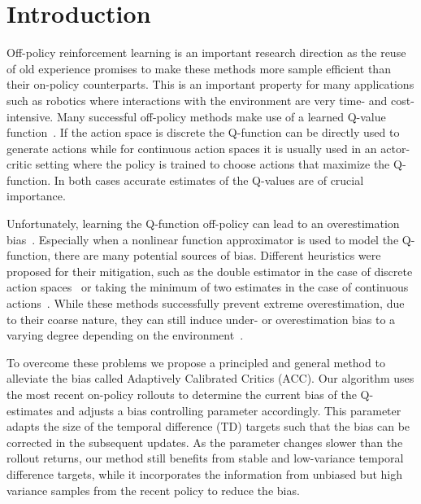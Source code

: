 \section{Introduction}






Off-policy reinforcement learning is an important research direction as the reuse of old experience promises to make these methods more sample efficient than their on-policy counterparts. This is an important property for many applications such as robotics where  interactions with the environment are very time- and cost-intensive.
Many successful off-policy methods make use of a learned Q-value function~\cite{td3,SAC,hessel2018rainbow,dqn15}. 
If the action space is discrete the Q-function can be directly  used to generate actions while for continuous action spaces it is usually used in an actor-critic setting where the policy is trained to choose actions that maximize the Q-function. In both cases accurate estimates of the Q-values are of crucial importance.

Unfortunately, learning the Q-function off-policy can lead to an overestimation bias~\cite{Thrun+Schwartz:1993}.
Especially when a nonlinear function approximator is used to model the Q-function, there are many potential sources of bias.
Different heuristics were proposed for their mitigation, such as the double estimator in the case of discrete action spaces~\cite{hasselt2016deepdouble} or taking the minimum of two estimates in the case of continuous actions~\cite{td3}.
While these methods successfully prevent extreme overestimation, due to their coarse nature, they can  still induce under- or overestimation bias to a varying degree depending on the environment~\cite{Lan2020Maxmin}.

To overcome these problems we propose a principled and general method to alleviate the bias called Adaptively Calibrated Critics (ACC).
Our algorithm uses the most recent on-policy rollouts to determine the current bias of the Q-estimates and adjusts a bias controlling parameter accordingly.
This parameter adapts the size of the temporal difference (TD) targets  such that the bias can be corrected in the subsequent updates.
As the parameter changes slower than the rollout returns, our method still benefits from stable and low-variance temporal difference targets, while it incorporates the information from unbiased but high variance samples from the recent policy to reduce the bias. 


